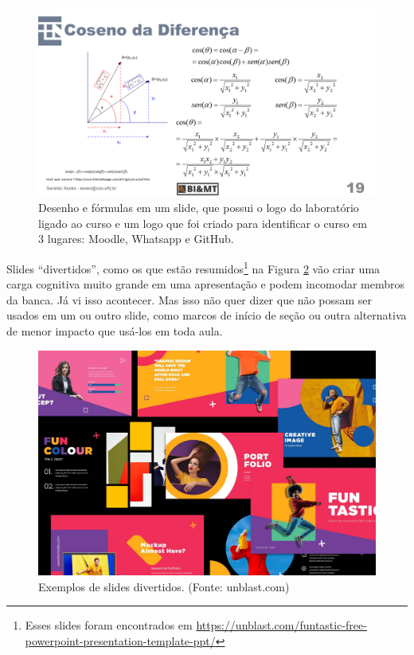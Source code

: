 \begin{figure}[hbt]
    \centering
    \includegraphics[width=\tam\linewidth]{imagens/desenhoeformulas.png}
    \caption{Desenho e fórmulas em um slide, que possui o logo do laboratório ligado ao curso e um logo que foi criado para identificar o curso em 3 lugares: Moodle, Whatsapp e GitHub.}
    \label{fig:formulas}
\end{figure}



Slides ``divertidos'', como os que estão resumidos\footnote{Esses slides foram encontrados em     \url{https://unblast.com/funtastic-free-powerpoint-presentation-template-ppt/}
} na Figura \ref{fig:fun} vão criar uma carga cognitiva muito grande em uma apresentação e podem incomodar membros da banca. Já vi isso acontecer. Mas isso não quer dizer que não possam ser usados em um ou outro slide, como marcos de início de seção ou outra alternativa de menor impacto que usá-los em toda aula.

\begin{figure}[hbt]
    \centering
    \includegraphics[width=\tam\linewidth]{imagens/funslide.jpg}
    \caption{Exemplos de slides divertidos.
        (Fonte: unblast.com) }
    \label{fig:fun}
\end{figure}

